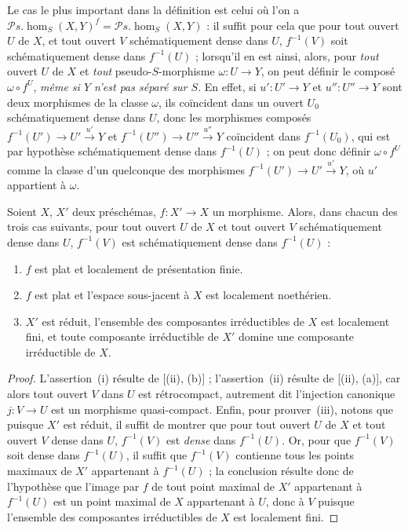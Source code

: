 \begin{env}[20.3.4]
\label{IV.20.3.4}
Le cas le plus important dans la définition  est celui où l'on a $\mathscr{P}\!s.\!\operatorname{hom}_S(X,Y)^f=\mathscr{P}\!s.\!\operatorname{hom}_S(X,Y)$ : il suffit pour cela que pour tout ouvert $U$ de $X$, et tout ouvert $V$ schématiquement dense dans $U$, $f^{-1}(V)$ soit schématiquement dense dans $f^{-1}(U)$ ; lorsqu'il en est ainsi, alors, pour \emph{tout} ouvert $U$ de $X$ et \emph{tout} pseudo-$S$-morphisme $\omega:U\to Y$, on peut définir le composé $\omega\circ f^U$, \emph{même si $Y$ n'est pas séparé sur $S$}.
En effet, si $u':U'\to Y$ et $u'':U''\to Y$ sont deux morphismes de la classe $\omega$, ils coïncident dans un ouvert $U_0$ schématiquement dense dans $U$, donc les morphismes composés $f^{-1}(U')\to U'\xrightarrow{u'}Y$ et $f^{-1}(U'')\to U''\xrightarrow{u''}Y$ coïncident dans $f^{-1}(U_0)$, qui est par hypothèse schématiquement dense dans $f^{-1}(U)$ ; on peut donc définir $\omega\circ f^U$ comme la classe d'un quelconque des morphismes $f^{-1}(U')\to U'\xrightarrow{u'}Y$, où $u'$ appartient à $\omega$.
\end{env}

\begin{proposition}[20.3.5]
\label{IV.20.3.5}
Soient $X$, $X'$ deux préschémas, $f:X'\to X$ un morphisme.
Alors, dans chacun des trois cas suivants, pour tout ouvert $U$ de $X$ et tout ouvert $V$ schématiquement dense dans $U$, $f^{-1}(V)$ est schématiquement dense dans $f^{-1}(U)$ :
\begin{enumerate}[label=\emph{(\roman*)}]
  \item $f$ est plat et localement de présentation finie.
  \item $f$ est plat et l'espace sous-jacent à $X$ est localement noethérien.
  \item $X'$ est réduit, l'ensemble des composantes irréductibles de $X$ est localement fini, et toute composante irréductible de $X'$ domine une composante irréductible de $X$.
\end{enumerate}
\end{proposition}

\begin{proof}
L'assertion~(i) résulte de [(ii), (b)] ; l'assertion~(ii) résulte de [(ii), (a)], car alors tout ouvert $V$ dans $U$ est rétrocompact, autrement dit l'injection canonique $j:V\to U$ est un morphisme quasi-compact.
Enfin, pour prouver~(iii), notons que puisque $X'$ est réduit, il suffit de montrer que pour tout ouvert $U$ de $X$ et tout ouvert $V$ dense dans $U$, $f^{-1}(V)$ est \emph{dense} dans $f^{-1}(U)$.
Or, pour que $f^{-1}(V)$ soit dense dans $f^{-1}(U)$, il suffit que $f^{-1}(V)$ contienne tous les points maximaux de $X'$ appartenant à $f^{-1}(U)$ ; la conclusion résulte donc de l'hypothèse que l'image par $f$ de tout point
maximal de $X'$ appartenant à $f^{-1}(U)$ est un point maximal de $X$ appartenant à $U$, donc à $V$ puisque l'ensemble des composantes irréductibles de $X$ est localement fini.
\end{proof}

